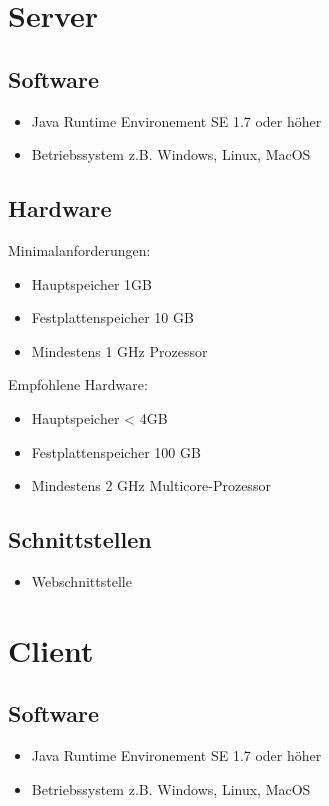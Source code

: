 \section{Server}
\subsection{Software}
   \begin{itemize}
      \item Java Runtime Environement SE 1.7 oder höher
      \item Betriebssystem z.B. Windows, Linux, MacOS
   \end{itemize}
\subsection{Hardware}
	Minimalanforderungen:
   \begin{itemize}
      \item Hauptspeicher 1GB
      \item Festplattenspeicher 10 GB
      \item Mindestens 1 GHz Prozessor
   \end{itemize}
   Empfohlene Hardware:
   \begin{itemize}
      \item Hauptspeicher < 4GB
      \item Festplattenspeicher 100 GB
      \item Mindestens 2 GHz Multicore-Prozessor
   \end{itemize}
\subsection{Schnittstellen}
   \begin{itemize}
   \item Webschnittstelle
   \end{itemize}
   \section{Client}
\subsection{Software}
   \begin{itemize}
      \item Java Runtime Environement SE 1.7 oder höher
      \item Betriebssystem z.B. Windows, Linux, MacOS
   \end{itemize}
